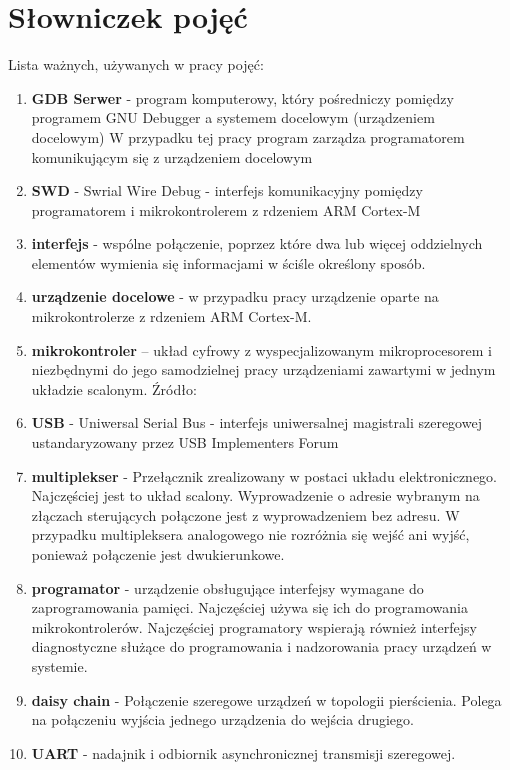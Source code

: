 \chapter{Słowniczek pojęć}
Lista ważnych, używanych w pracy pojęć:
\begin{enumerate}
\item 
\textbf{GDB Serwer} -  program komputerowy, który pośredniczy pomiędzy programem GNU Debugger a systemem docelowym (urządzeniem docelowym) W przypadku tej pracy program zarządza programatorem komunikującym się z urządzeniem docelowym
\item 
\textbf{SWD} - Swrial Wire Debug - interfejs komunikacyjny pomiędzy programatorem i mikrokontrolerem z rdzeniem ARM Cortex-M
\item 
\textbf{interfejs} - wspólne połączenie, poprzez które dwa lub więcej oddzielnych elementów wymienia się informacjami w ściśle określony sposób.
\item 
\textbf{urządzenie docelowe} - w przypadku pracy urządzenie oparte na mikrokontrolerze z rdzeniem ARM Cortex-M.
\item 
\textbf{mikrokontroler} – układ cyfrowy z wyspecjalizowanym  mikroprocesorem i niezbędnymi do  jego samodzielnej pracy urządzeniami zawartymi w jednym układzie scalonym. Źródło:\cite{mikrokontroler_definicja}\\
\item
\textbf{USB} - Uniwersal Serial Bus - interfejs uniwersalnej magistrali szeregowej ustandaryzowany przez USB Implementers Forum
\item
\textbf{multiplekser} - Przełącznik zrealizowany w postaci układu elektronicznego. Najczęściej jest to układ scalony. Wyprowadzenie o adresie wybranym na złączach sterujących połączone jest z wyprowadzeniem bez adresu. W przypadku multipleksera analogowego nie rozróżnia się wejść ani wyjść, ponieważ połączenie jest dwukierunkowe.
\item 
\textbf{programator} - urządzenie obsługujące interfejsy wymagane do zaprogramowania pamięci. Najczęściej używa się ich do programowania mikrokontrolerów. Najczęściej programatory wspierają również interfejsy diagnostyczne służące do  programowania i nadzorowania pracy urządzeń w systemie.
\item
\textbf{daisy chain} - Połączenie szeregowe urządzeń w topologii pierścienia. Polega na połączeniu wyjścia jednego urządzenia do wejścia drugiego.
\item
\textbf{UART} - nadajnik i odbiornik asynchronicznej transmisji szeregowej.

    
\end{enumerate}
